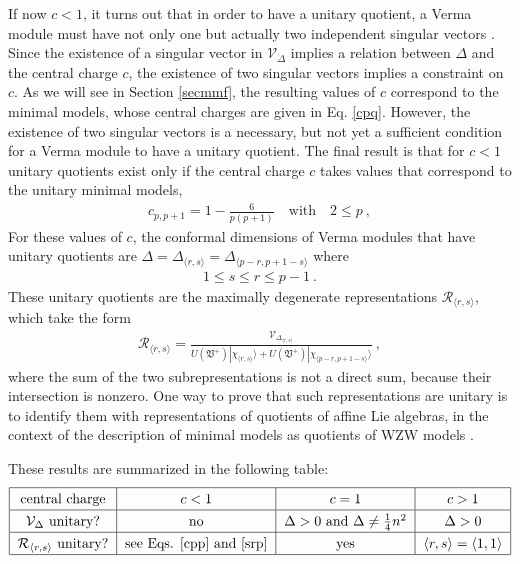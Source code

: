 \documentclass[12pt, a4paper, notitlepage, twoside]{report}
\numberwithin{equation}{section}
\theoremstyle{break}
\begin{document}
If now $c<1$, it turns out that in order to have a unitary quotient, a Verma module must have not only one but actually two independent singular vectors \cite{fms97}. 
Since the existence of a singular vector in $\mathcal{V}_\Delta$ implies a relation between $\Delta$ and the central charge $c$, the existence of two singular vectors implies a constraint on $c$. 
As we will see in Section \ref{secmmf}, the resulting values of $c$ correspond to the minimal models, whose central charges are given in Eq. \eqref{cpq}. 
However, the existence of two singular vectors is a necessary, but not yet a sufficient condition for a Verma module to have a unitary quotient.
The final result is that for $c<1$ unitary quotients exist only if the central charge $c$ takes values that correspond to the unitary minimal models,
\begin{align}
 c_{p,p+1} = 1-\frac{6}{p(p+1)}  \quad \text{with} \quad 2\leq p\ ,
\label{cpp}
\end{align}
For these values of $c$,
the conformal dimensions of Verma modules that have unitary quotients are $\Delta=\Delta_{\langle r,s \rangle}=\Delta_{\langle p-r, p+1-s \rangle}$ where
\begin{align}
   1\leq s\leq r\leq p-1 \ .
\label{srp}
\end{align}
These unitary quotients are the maximally degenerate representations $\mathcal{R}_{\langle r,s \rangle}$, which take the form
\begin{align}
 \mathcal{R}_{\langle r,s \rangle} = \frac{\mathcal{V}_{\Delta_{\langle r,s \rangle}}}{U(\mathfrak{V}^+)|\chi_{\langle r,s \rangle}\rangle + U(\mathfrak{V}^+)|\chi_{\langle p-r,p+1-s \rangle}\rangle}\ ,
\label{rrs}
\end{align}
where the sum of the two subrepresentations is not a direct sum, because their intersection is nonzero. One way to prove that such representations are unitary is to identify them with representations of quotients of affine Lie algebras, in the context of the description of minimal models as quotients of WZW models \cite{fms97}.

These results are summarized in the following table:
\begin{align}
\renewcommand{\arraystretch}{1.3}
 \begin{tabular}{|c|c|c|c|}
  \hline
central charge & $c<1$ & $c=1$ & $c>1$
\\
\hline
$\mathcal{V}_\Delta$ unitary? & no & $\Delta>0$ and $\Delta \neq \frac14 n^2$ & $\Delta>0$
\\
\hline
$\mathcal{R}_{\langle r,s\rangle}$ unitary? & see Eqs. \eqref{cpp} and \eqref{srp} &  yes & $\langle r,s \rangle = \langle 1,1\rangle$
\\
\hline
 \end{tabular}
\end{align}
\end{document}
